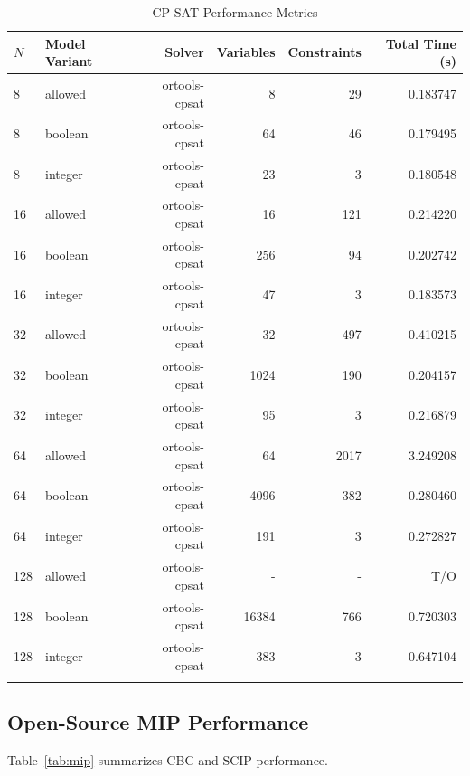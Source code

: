 \documentclass[a4paper,fleqn]{cas-sc}
\begin{document}
\begin{table}[htbp]
\centering
\caption{CP-SAT Performance Metrics} \label{tab:cpsat}
\begin{tabular}{llrrrr}
\toprule
$N$ & Model Variant & Solver & Variables & Constraints & Total Time (s) \\
\midrule
8 & allowed & ortools-cpsat & 8 & 29 & 0.183747 \\
8 & boolean & ortools-cpsat & 64 & 46 & 0.179495 \\
8 & integer & ortools-cpsat & 23 & 3 & 0.180548 \\
16 & allowed & ortools-cpsat & 16 & 121 & 0.214220 \\
16 & boolean & ortools-cpsat & 256 & 94 & 0.202742 \\
16 & integer & ortools-cpsat & 47 & 3 & 0.183573 \\
32 & allowed & ortools-cpsat & 32 & 497 & 0.410215 \\
32 & boolean & ortools-cpsat & 1024 & 190 & 0.204157 \\
32 & integer & ortools-cpsat & 95 & 3 & 0.216879 \\
64 & allowed & ortools-cpsat & 64 & 2017 & 3.249208 \\
64 & boolean & ortools-cpsat & 4096 & 382 & 0.280460 \\
64 & integer & ortools-cpsat & 191 & 3 & 0.272827 \\
128 & allowed & ortools-cpsat & - & - & T/O \\
128 & boolean & ortools-cpsat & 16384 & 766 & 0.720303 \\
128 & integer & ortools-cpsat & 383 & 3 & 0.647104 \\
\bottomrule
\tabularnewline
\end{tabular}
\end{table}

\subsection{Open-Source MIP Performance}
Table~\ref{tab:mip} summarizes CBC and SCIP performance.
\end{document}
